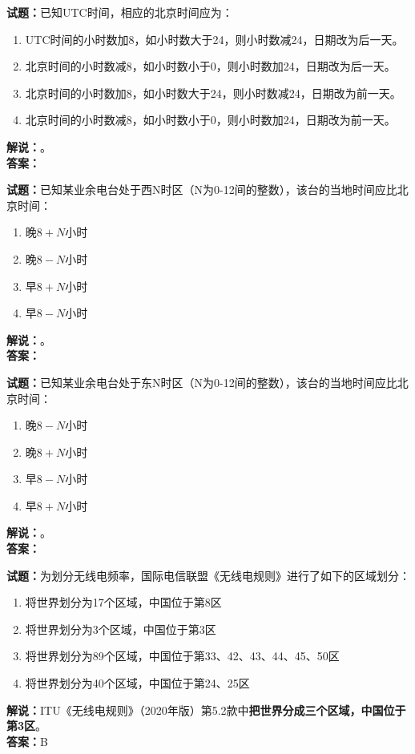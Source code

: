 \documentclass{ctexbook}
\begin{document}
\noindent\textbf{试题：}已知UTC时间，相应的北京时间应为：
\begin{enumerate}[leftmargin=3em]
\item UTC时间的小时数加8，如小时数大于24，则小时数减24，日期改为后一天。
\item 北京时间的小时数减8，如小时数小于0，则小时数加24，日期改为后一天。
\item 北京时间的小时数加8，如小时数大于24，则小时数减24，日期改为前一天。
\item 北京时间的小时数减8，如小时数小于0，则小时数加24，日期改为前一天。
\end{enumerate}
\noindent\textbf{解说：}\textbf{}。\\\noindent\textbf{答案：}

\bigskip




\noindent\textbf{试题：}已知某业余电台处于西N时区（N为0-12间的整数），该台的当地时间应比北京时间：
\begin{enumerate}[leftmargin=3em]
\item 晚\(8+N\)小时
\item 晚\(8-N\)小时
\item 早\(8+N\)小时
\item 早\(8-N\)小时
\end{enumerate}
\noindent\textbf{解说：}\textbf{}。\\\noindent\textbf{答案：}

\bigskip




\noindent\textbf{试题：}已知某业余电台处于东N时区（N为0-12间的整数），该台的当地时间应比北京时间：
\begin{enumerate}[leftmargin=3em]
\item 晚\(8-N\)小时
\item 晚\(8+N\)小时
\item 早\(8-N\)小时
\item 早\(8+N\)小时
\end{enumerate}
\noindent\textbf{解说：}\textbf{}。\\\noindent\textbf{答案：}

\bigskip




\noindent\textbf{试题：}为划分无线电频率，国际电信联盟《无线电规则》进行了如下的区域划分：
\begin{enumerate}[leftmargin=3em]
\item 将世界划分为17个区域，中国位于第8区
\item 将世界划分为3个区域，中国位于第3区
\item 将世界划分为89个区域，中国位于第33、42、43、44、45、50区
\item 将世界划分为40个区域，中国位于第24、25区
\end{enumerate}
\noindent\textbf{解说：}ITU《无线电规则》（2020年版）第5.2款中\textbf{把世界分成三个区域，中国位于第3区}。\\\noindent\textbf{答案：}B
\end{document}
